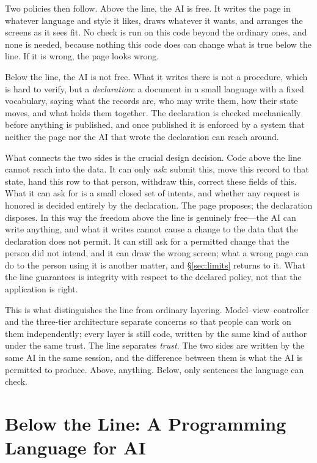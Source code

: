 \documentclass[11pt]{article}
\begin{document}
Two policies then follow. Above the line, the AI is free. It writes the page in whatever language and style it likes, draws whatever it wants, and arranges the screens as it sees fit. No check is run on this code beyond the ordinary ones, and none is needed, because nothing this code does can change what is true below the line. If it is wrong, the page looks wrong.

Below the line, the AI is not free. What it writes there is not a procedure, which is hard to verify, but a \emph{declaration}: a document in a small language with a fixed vocabulary, saying what the records are, who may write them, how their state moves, and what holds them together. The declaration is checked mechanically before anything is published, and once published it is enforced by a system that neither the page nor the AI that wrote the declaration can reach around.

What connects the two sides is the crucial design decision. Code above the line cannot reach into the data. It can only \emph{ask}: submit this, move this record to that state, hand this row to that person, withdraw this, correct these fields of this. What it can ask for is a small closed set of intents, and whether any request is honored is decided entirely by the declaration. The page proposes; the declaration disposes. In this way the freedom above the line is genuinely free---the AI can write anything, and what it writes cannot cause a change to the data that the declaration does not permit. It can still ask for a permitted change that the person did not intend, and it can draw the wrong screen; what a wrong page can do to the person using it is another matter, and \S\ref{sec:limits} returns to it. What the line guarantees is integrity with respect to the declared policy, not that the application is right.

This is what distinguishes the line from ordinary layering. Model--view--controller and the three-tier architecture separate concerns so that people can work on them independently; every layer is still code, written by the same kind of author under the same trust. The line separates \emph{trust}. The two sides are written by the same AI in the same session, and the difference between them is what the AI is permitted to produce. Above, anything. Below, only sentences the language can check.

\section{Below the Line: A Programming Language for AI}
\label{sec:language}
\end{document}
